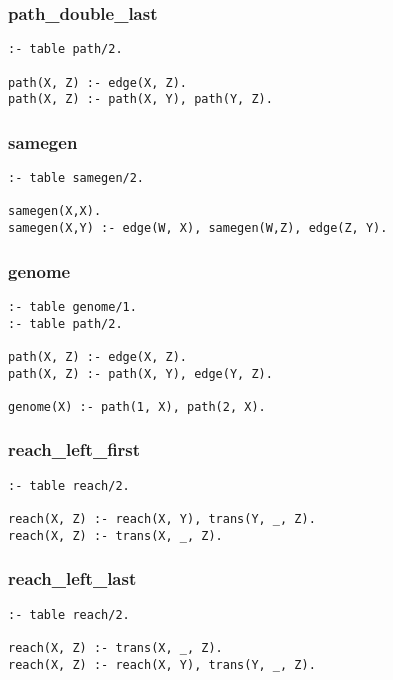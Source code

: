 \subsubsection*{path\_double\_last}

\begin{Verbatim}
:- table path/2.

path(X, Z) :- edge(X, Z).
path(X, Z) :- path(X, Y), path(Y, Z).
\end{Verbatim}

\subsubsection*{samegen}

\begin{Verbatim}
:- table samegen/2.

samegen(X,X).
samegen(X,Y) :- edge(W, X), samegen(W,Z), edge(Z, Y).
\end{Verbatim}

\subsubsection*{genome}

\begin{Verbatim}
:- table genome/1.
:- table path/2.

path(X, Z) :- edge(X, Z).
path(X, Z) :- path(X, Y), edge(Y, Z).

genome(X) :- path(1, X), path(2, X).
\end{Verbatim}

\subsubsection*{reach\_left\_first}

\begin{Verbatim}   
:- table reach/2.

reach(X, Z) :- reach(X, Y), trans(Y, _, Z).
reach(X, Z) :- trans(X, _, Z).
\end{Verbatim}

\subsubsection*{reach\_left\_last}

\begin{Verbatim}
:- table reach/2.

reach(X, Z) :- trans(X, _, Z).
reach(X, Z) :- reach(X, Y), trans(Y, _, Z).
\end{Verbatim}

